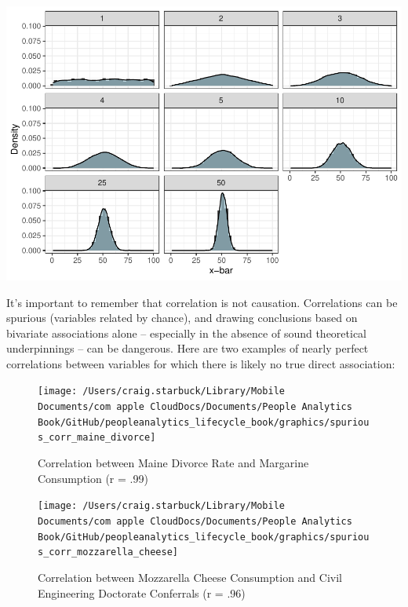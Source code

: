 \documentclass[]{book}
\begin{document}
\includegraphics{_main_files/figure-latex/unnamed-chunk-32-1.pdf}

It's important to remember that correlation is not causation. Correlations can be spurious (variables related by chance), and drawing conclusions based on bivariate associations alone -- especially in the absence of sound theoretical underpinnings -- can be dangerous. Here are two examples of nearly perfect correlations between variables for which there is likely no true direct association:

\begin{figure}

{\centering \texttt{[image: /Users/craig.starbuck/Library/Mobile Documents/com~apple~CloudDocs/Documents/People Analytics Book/GitHub/peopleanalytics\_lifecycle\_book/graphics/spurious\_corr\_maine\_divorce]} 

}

\caption{Correlation between Maine Divorce Rate and Margarine Consumption (r = .99)}\label{fig:spur-corr-1}
\end{figure}

\begin{figure}

{\centering \texttt{[image: /Users/craig.starbuck/Library/Mobile Documents/com~apple~CloudDocs/Documents/People Analytics Book/GitHub/peopleanalytics\_lifecycle\_book/graphics/spurious\_corr\_mozzarella\_cheese]} 

}

\caption{Correlation between Mozzarella Cheese Consumption and Civil Engineering Doctorate Conferrals (r = .96)}\label{fig:spur-corr-2}
\end{figure}
\end{document}
